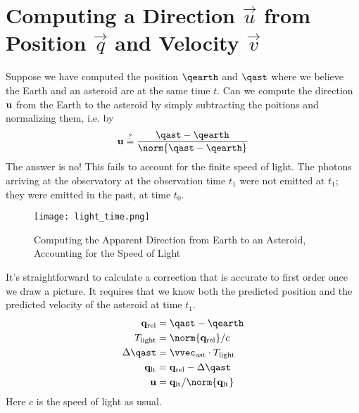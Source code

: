 \section{Computing a Direction $\vec{u}$ from Position $\vec{q}$ and Velocity $\vec{v}$}
\label{section_pos_vel_to_dir}
Suppose we have computed the position $\qearth$ and $\qast$ where we believe the Earth and an asteroid are at the same time $t$.
Can we compute the direction $\mathbf{u}$ from the Earth to the asteroid by simply subtracting the poitions and normalizing them, i.e. by
$$ \uvec \stackrel{?}{=} \frac{\qast - \qearth}{\norm{\qast - \qearth}}$$
The answer is no! This fails to account for the finite speed of light.
The photons arriving at the observatory at the observation time $t_1$ were not emitted at $t_1$; they were emitted in the past, at time $t_0$.
\begin{figure}[hbt!]
\begin{center}
\texttt{[image: light\_time.png]}
\caption{Computing the Apparent Direction from Earth to an Asteroid, Accounting for the Speed of Light}
\end{center}
\end{figure}
It's straightforward to calculate a correction that is accurate to first order once we draw a picture.
It requires that we know both the predicted position and the predicted velocity of the asteroid at time $t_1$.
\begin{align*}
\mathbf{q}_{\mathrm{rel}} &= \qast - \qearth \\
T_{\mathrm{light}} &= \norm{ \mathbf{q}_{\mathrm{rel}} } / c \\
\Delta \qast &= \vvec_{\mathrm{ast}} \cdot T_{\mathrm{light}} \\
\mathbf{q}_{\mathrm{lt}} &= \mathbf{q}_{\mathrm{rel}} - \Delta \qast \\
\uvec &= \mathbf{q}_{\mathrm{lt}} / \norm{\mathbf{q}_{\mathrm{lt}}}
\end{align*}
Here $c$ is the speed of light as usual.

